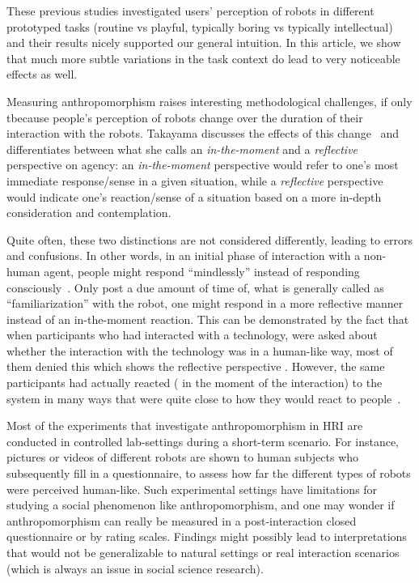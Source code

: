 \documentclass[a4,twocolumn,10pt]{article}
\begin{document}
These previous studies investigated users' perception of robots in
different prototyped tasks (routine vs playful, typically boring vs typically
intellectual) and their results nicely supported our general intuition.
In this article, we show that much more subtle variations in the task context do
lead to very noticeable effects as well.

Measuring anthropomorphism raises interesting methodological challenges, if only
tbecause people's perception of robots change over the duration of their
interaction with the robots. Takayama discusses the effects of this
change~\cite{takayama_perspectives_2012} and differentiates between what she calls an
\emph{in-the-moment} and a \emph{reflective} perspective on agency: an
\emph{in-the-moment} perspective would refer to one's most immediate
response/sense in a given situation, while a \emph{reflective}
perspective would indicate one's reaction/sense of a situation based on a more
in-depth  consideration and contemplation.

Quite often, these two distinctions are not considered differently, leading to
errors and confusions.  In other words, in an initial phase of interaction with
a non-human agent, people might respond ``mindlessly'' instead of responding
consciously~\cite{nass_machines_2000}. Only post a due amount of
time of, what is generally called as ``familiarization'' with the robot, one
might respond in a more reflective manner instead of an in-the-moment reaction.
This can be demonstrated by the fact that when participants who had interacted
with a technology, were asked about whether the interaction with the technology
was in a human-like way, most of them denied this which shows the reflective
perspective . However, the same participants had actually reacted ( in the
moment of the interaction) to the system in many ways that were quite close to
how they would react to people~\cite{reeves_media_1996}.

Most of the experiments that investigate anthropomorphism in HRI are conducted
in controlled lab-settings during a short-term scenario. For instance, pictures
or videos of different robots are shown to human subjects who subsequently fill
in a questionnaire, to assess how far the different types of robots were
perceived human-like. Such experimental settings have limitations for studying a
social phenomenon like anthropomorphism, and one may wonder if anthropomorphism
can really be measured in a post-interaction closed questionnaire or by rating
scales. Findings might possibly lead to interpretations that would not be
generalizable to natural settings or real interaction scenarios (which is always
an issue in social science research).
\end{document}
